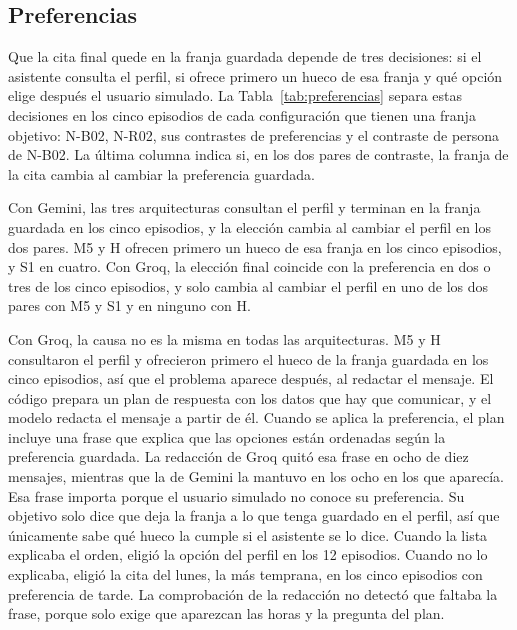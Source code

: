 \subsection{Preferencias}
\label{sec:resultados-preferencias}

Que la cita final quede en la franja guardada depende de tres decisiones: si el
asistente consulta el perfil, si ofrece primero un hueco de esa franja y qué
opción elige después el usuario simulado. La Tabla~\ref{tab:preferencias}
separa estas decisiones en los cinco episodios de cada configuración que tienen
una franja objetivo: N-B02, N-R02, sus contrastes de preferencias y el
contraste de persona de N-B02. La última columna indica si, en los dos pares de
contraste, la franja de la cita cambia al cambiar la preferencia guardada.

\begin{table}[!htbp]
\centering
\small
\caption[Descomposición del uso de la franja guardada.]{Descomposición del uso
de la franja guardada: consulta del perfil, primera oferta del asistente,
elección final y cambio en los pares de contraste.}
\label{tab:preferencias}

\end{table}

Con Gemini, las tres arquitecturas consultan el perfil y terminan en la franja
guardada en los cinco episodios, y la elección cambia al cambiar el perfil en
los dos pares. M5 y H ofrecen primero un hueco de esa franja en los cinco
episodios, y S1 en cuatro. Con Groq, la elección final
coincide con la preferencia en dos o tres de los cinco episodios, y solo cambia
al cambiar el perfil en uno de los dos pares con M5 y S1 y en ninguno con H.

Con Groq, la causa no es la misma en todas las arquitecturas. M5 y H
consultaron el perfil y ofrecieron primero el hueco de la franja guardada en
los cinco episodios, así que el problema aparece después, al redactar el
mensaje. El código prepara un plan de respuesta con los datos que hay que
comunicar, y el modelo redacta el mensaje a partir de él. Cuando se aplica la
preferencia, el plan incluye una frase que explica que las opciones están
ordenadas según la preferencia guardada. La redacción de Groq quitó esa frase
en ocho de diez mensajes, mientras que la de Gemini la mantuvo en los ocho en
los que aparecía. Esa frase importa porque el usuario simulado no conoce su
preferencia. Su objetivo solo dice que deja la franja a lo que tenga guardado
en el perfil, así que únicamente sabe qué hueco la cumple si el asistente se lo
dice. Cuando la lista explicaba el orden, eligió la opción del perfil en los 12
episodios. Cuando no lo explicaba, eligió la cita del lunes, la más temprana,
en los cinco episodios con preferencia de tarde. La comprobación de la
redacción no detectó que faltaba la frase, porque solo exige que aparezcan las
horas y la pregunta del plan.

